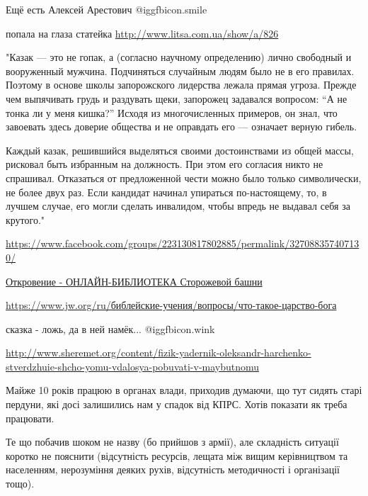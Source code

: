 \begin{itemize}
Ещё есть Алексей Арестович  @igg{fbicon.smile} 


попала на глаза статейка \url{http://www.litsa.com.ua/show/a/826}

"Казак — это не гопак, а (согласно научному определению) лично свободный и
вооруженный мужчина. Подчиняться случайным людям было не в его правилах.
Поэтому в основе школы запорожского лидерства лежала прямая угроза. Прежде чем
выпячивать грудь и раздувать щеки, запорожец задавался вопросом: “А не тонка ли
у меня кишка?” Исходя из многочисленных примеров, он знал, что завоевать здесь
доверие общества и не оправдать его — означает верную гибель.

Каждый казак, решившийся выделяться своими достоинствами из общей массы,
рисковал быть избранным на должность. При этом его согласия никто не спрашивал.
Отказаться от предложенной чести можно было только символически, не более двух
раз. Если кандидат начинал упираться по-настоящему, то, в лучшем случае, его
могли сделать инвалидом, чтобы впредь не выдавал себя за крутого."


\url{https://www.facebook.com/groups/223130817802885/permalink/327088357407130/}


\href{https://wol.jw.org/ru/wol/b/r2/lp-u/bi12/66/16#study=discover}{%
Откровение - ОНЛАЙН-БИБЛИОТЕКА Сторожевой башни%
}


\url{https://www.jw.org/ru/библейские-учения/вопросы/что-такое-царство-бога}

сказка - ложь, да в ней намёк...  @igg{fbicon.wink} 

\url{http://www.sheremet.org/content/fizik-yadernik-oleksandr-harchenko-stverdzhuie-shcho-yomu-vdalosya-pobuvati-v-maybutnomu}


Майже 10 років працюю в органах влади, приходив думаючи, що тут сидять старі
пердуни, які досі залишились нам у спадок від КПРС. Хотів показати як треба
працювати.

Те що побачив шоком не назву (бо прийшов з армії), але складність ситуації
коротко не пояснити (відсутність ресурсів, лещата між вищим керівництвом та
населенням, нерозуміння деяких рухів, відсутність методичності і організації
тощо).


\end{itemize}
